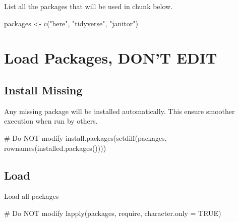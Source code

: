 \documentclass[
  letterpaper,
  DIV=11,
  numbers=noendperiod]{scrreprt}
\newenvironment{Shaded}{\begin{snugshade}}{\end{snugshade}}
\newcommand{\AttributeTok}[1]{\textcolor[rgb]{0.40,0.45,0.13}{#1}}
\newcommand{\CommentTok}[1]{\textcolor[rgb]{0.37,0.37,0.37}{#1}}
\newcommand{\ConstantTok}[1]{\textcolor[rgb]{0.56,0.35,0.01}{#1}}
\newcommand{\FunctionTok}[1]{\textcolor[rgb]{0.28,0.35,0.67}{#1}}
\newcommand{\NormalTok}[1]{\textcolor[rgb]{0.00,0.23,0.31}{#1}}
\newcommand{\OtherTok}[1]{\textcolor[rgb]{0.00,0.23,0.31}{#1}}
\newcommand{\StringTok}[1]{\textcolor[rgb]{0.13,0.47,0.30}{#1}}
\begin{document}

List all the packages that will be used in chunk below.

\begin{Shaded}
\begin{Highlighting}[]
\NormalTok{packages }\OtherTok{\textless{}{-}} \FunctionTok{c}\NormalTok{(}\StringTok{"here"}\NormalTok{, }\StringTok{"tidyverse"}\NormalTok{, }\StringTok{"janitor"}\NormalTok{)}
\end{Highlighting}
\end{Shaded}

\section*{Load Packages, DON'T EDIT}\label{sec-packages}


\subsection*{Install Missing}\label{install-missing}

Any missing package will be installed automatically. This ensure
smoother execution when run by others.

\begin{Shaded}
\begin{Highlighting}[]
\CommentTok{\# Do NOT modify}
\FunctionTok{install.packages}\NormalTok{(}\FunctionTok{setdiff}\NormalTok{(packages, }\FunctionTok{rownames}\NormalTok{(}\FunctionTok{installed.packages}\NormalTok{())))}
\end{Highlighting}
\end{Shaded}

\subsection*{Load}\label{load}

Load all packages

\begin{Shaded}
\begin{Highlighting}[]
\CommentTok{\# Do NOT modify}
\FunctionTok{lapply}\NormalTok{(packages, require, }\AttributeTok{character.only =} \ConstantTok{TRUE}\NormalTok{)}
\end{Highlighting}
\end{Shaded}
\end{document}
